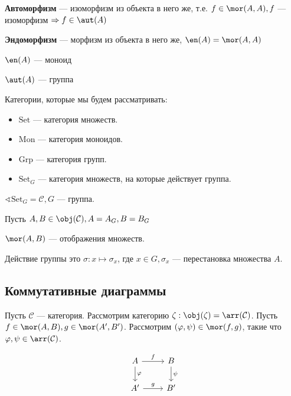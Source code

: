 \begin{definition}
    \textbf{Автоморфизм} --- изоморфизм из объекта в него же, т.е. \(f \in \mor(A, A), f\) --- изоморфизм \( \Rightarrow f \in \aut(A)\)
\end{definition}

\begin{definition}
    \textbf{Эндоморфизм} --- морфизм из объекта в него же, \(\en(A) = \mor(A, A)\)
\end{definition}

\begin{lemma}
    \(\en(A)\) --- моноид
\end{lemma}

\begin{lemma}
    \(\aut(A)\) --- группа
\end{lemma}

Категории, которые мы будем рассматривать:
\begin{itemize}
    \item \(\mathrm{Set}\) --- категория множеств.
    \item \(\mathrm{Mon}\) --- категория моноидов.
    \item \(\mathrm{Grp}\) --- категория групп.
    \item \(\mathrm{Set}_G\) --- категория множеств, на которые действует группа.
\end{itemize}

\(\sphericalangle \mathrm{Set}_G = \mathcal{C}, G\) --- группа.

Пусть \(A, B \in \obj(\mathcal{C}), A = A_G, B = B_G\)

\(\mor(A, B)\) --- отображения множеств.

Действие группы это \(\sigma : x \mapsto \sigma_x\), где \(x \in G, \sigma_x\) --- перестановка множества \(A\).

\subsection{Коммутативные диаграммы}

Пусть \(\mathcal{C}\) --- категория. Рассмотрим категорию \(\zeta : \obj(\zeta) = \arr(\mathcal{C})\). Пусть \(f \in \mor(A, B), g \in \mor(A', B')\). Рассмотрим \((\varphi, \psi) \in \mor(f, g)\), такие что \(\varphi, \psi \in \arr(\mathcal{C})\).

\[\begin{tikzcd}
        A \arrow{r}{f} \arrow{d}{\varphi} & B \arrow{d}{\psi} \\
        A' \arrow{r}{g} & B'
    \end{tikzcd}\]

